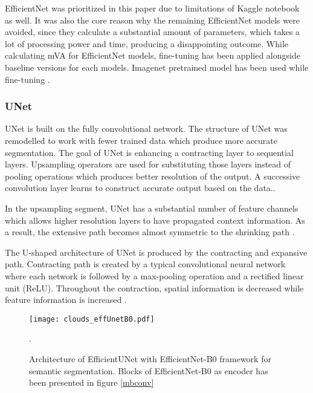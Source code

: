 \documentclass[conference]{IEEEtran}
\begin{document}
EfficientNet was prioritized in this paper due to limitations of Kaggle notebook as well. It was also the core reason why the remaining EfficientNet models were avoided, since they calculate a substantial amount of parameters, which takes a lot of processing power and time, producing a disappointing outcome. While calculating mVA for EfficientNet models, fine-tuning has been applied alongside baseline versions for each models. Imagenet pretrained model has been used while fine-tuning \cite{Yakubovskiy:2019}. 

\subsubsection{UNet}
UNet is built on the fully convolutional network. 
The structure of UNet was remodelled to work with fewer trained data which produce more accurate segmentation. The goal of UNet is enhancing a contracting layer to sequential layers. Upsampling operators are used for substituting those layers instead of pooling operations which produces better resolution of the output. A successive convolution layer learns to construct accurate output based on the data.\cite{ronneberger2015u}.

In the upsampling segment, UNet has a substantial number of feature channels which allows higher resolution layers to have propagated context information. As a result, the extensive path becomes almost symmetric to the shrinking path \cite{long2015fully}. 

The U-shaped architecture of UNet is produced by the contracting and expansive path. Contracting path is created by a typical convolutional neural network where each network is followed by a max-pooling operation and a rectified linear unit (ReLU). Throughout the contraction, spatial information is decreased while feature information is increased \cite{ronneberger2015u}.

\begin{figure*}[ht!]
 \center
  \texttt{[image: clouds\_effUnetB0.pdf]}
  \caption{Architecture of EfficientUNet with EfficientNet-B0 framework for semantic segmentation. Blocks of EfficientNet-B0 as encoder has been presented in figure \ref{mbconv}}.
  \label{efficientunet}
\end{figure*}
\end{document}

